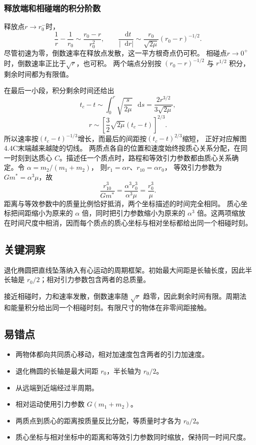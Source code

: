\documentclass[UTF8,fontset=fandol,a4paper,11pt]{ctexart}
\newcommand{\dd}{\mathop{}\!\mathrm{d}}
\begin{document}
\subsubsection*{释放端和相碰端的积分阶数}
释放点$r\to r_0^-$时，
\[
\frac1r-\frac1{r_0}\sim\frac{r_0-r}{r_0^2},
\qquad \frac{\dd t}{|\dd r|}
\sim\frac{r_0}{\sqrt{2\mu}}(r_0-r)^{-1/2}.
\]
尽管初速为零，倒数速率在释放点发散，这一平方根奇点仍可积。
相碰点$r\to0^+$时，倒数速率正比于$\sqrt r$，也可积。
两个端点分别按 $(r_0-r)^{-1/2}$ 与 $r^{1/2}$ 积分，剩余时间都为有限值。

在最后一小段，积分剩余时间还给出
\[
t_c-t\sim\int_0^r\sqrt{\frac{s}{2\mu}}\,\dd s
=\frac{2r^{3/2}}{3\sqrt{2\mu}},
\]
\[
r\sim\left[\frac32\sqrt{2\mu}(t_c-t)\right]^{2/3}.
\]
所以速率按$(t_c-t)^{-1/3}$增长，而最后的间距按$(t_c-t)^{2/3}$缩短，
正好对应解图4.4C末端越来越陡的切线。
两质点各自的位置和速度始终按质心关系分配，在同一时刻到达质心 $C$。描述任一个质点时，路程和等效引力参数都由质心关系确定。令 $\alpha=m_2/(m_1+m_2)$，
则$r_1=\alpha r$、$r_{10}=\alpha r_0$，
等效引力参数为$Gm^*=\alpha^3\mu$，故
\[
\frac{r_{10}^3}{Gm^*}=\frac{\alpha^3r_0^3}{\alpha^3\mu}
=\frac{r_0^3}{\mu}.
\]
距离与等效参数中的质量比例恰好抵消，两个坐标描述的时间完全相同。
质心坐标把间距缩小为原来的 $\alpha$ 倍，同时把引力参数缩小为原来的 $\alpha^3$ 倍。这两项缩放在时间尺度中相消，因而每个质点的质心坐标与相对坐标都给出同一个相碰时刻。





\subsection*{关键洞察}

退化椭圆把直线坠落纳入有心运动的周期框架。初始最大间距是长轴长度，因此半长轴是
\(r_0/2\)；相对引力参数包含两者的总质量。

接近相碰时，力和速率发散，倒数速率随 $\sqrt r$ 趋零，因此剩余时间有限。周期法和能量积分给出同一个相碰时刻。有限尺寸的物体在非零间距接触。



\subsection*{易错点}

\begin{itemize}
\item 两物体都向共同质心移动，相对加速度包含两者的引力加速度。
\item 退化椭圆的长轴是最大间距 $r_0$，半长轴为 $r_0/2$。
\item 从远端到近端经过半周期。
\item 相对运动使用引力参数 $G(m_1+m_2)$。
\item 两质点到质心的距离按质量反比分配，等质量时才各为 $r_0/2$。
\item 质心坐标与相对坐标中的距离和等效引力参数同时缩放，保持同一时间尺度。
\end{itemize}
\end{document}
